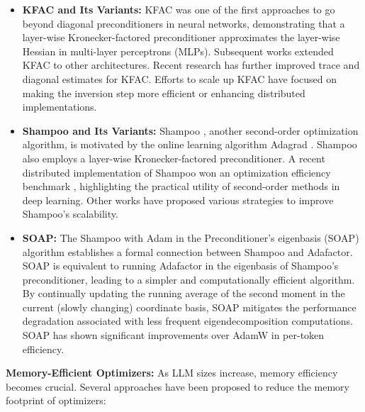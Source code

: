 \begin{itemize}
\item \textbf{KFAC and Its Variants:} KFAC \citep{martens2015optimizing} was one of the first approaches to go beyond diagonal preconditioners in neural networks, demonstrating that a layer-wise Kronecker-factored preconditioner approximates the layer-wise Hessian in multi-layer perceptrons (MLPs). Subsequent works \citep{martens2018kronecker, osawa2018large} extended KFAC to other architectures. Recent research \citep{george2018fast, gao2021trace} has further improved trace and diagonal estimates for KFAC. Efforts to scale up KFAC \citep{ba2017distributed, puiu2022randomized, puiu2022brand, eschenhagen2023kronecker} have focused on making the inversion step more efficient or enhancing distributed implementations.

\item \textbf{Shampoo and Its Variants:} Shampoo \citep{gupta2018shampoo}, another second-order optimization algorithm, is motivated by the online learning algorithm Adagrad \citep{duchi2011adaptive}. Shampoo also employs a layer-wise Kronecker-factored preconditioner. A recent distributed implementation of Shampoo \citep{shi2023distributed} won an optimization efficiency benchmark \citep{dahl2023benchmarking}, highlighting the practical utility of second-order methods in deep learning. Other works \citep{anil2020scalable, peirson2022fishy, lin2024can, wang20244,zhao2024deconstructing} have proposed various strategies to improve Shampoo's scalability.

\item \textbf{SOAP:} The Shampoo with Adam in the Preconditioner's eigenbasis (SOAP) algorithm \citep{vyas2024soap} establishes a formal connection between Shampoo and Adafactor. SOAP is equivalent to running Adafactor in the eigenbasis of Shampoo's preconditioner, leading to a simpler and computationally efficient algorithm. By continually updating the running average of the second moment in the current (slowly changing) coordinate basis, SOAP mitigates the performance degradation associated with less frequent eigendecomposition computations. SOAP has shown significant improvements over AdamW in per-token efficiency.
\end{itemize}

\noindent\textbf{Memory-Efficient Optimizers:} As LLM sizes increase, memory efficiency becomes crucial. Several approaches have been proposed to reduce the memory footprint of optimizers:

